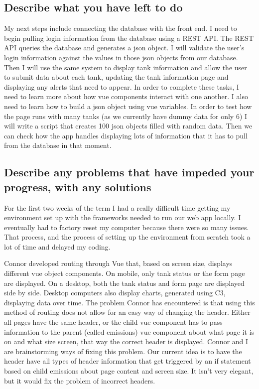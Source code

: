 \documentclass[draftclsnofoot,onecolumn,letterpaper,10pt,compsoc]{IEEEtran}
\begin{document}
\subsection{Describe what you have left to do}
My next steps include connecting the database with the front end. I need to begin pulling login information from the database using a REST API. The REST API queries the database and generates a json object. I will validate the user’s login information against the values in those json objects from our database. Then I will use the same system to display tank information and allow the user to submit data about each tank, updating the tank information page and displaying any alerts that need to appear. In order to complete these tasks, I need to learn more about how vue components interact with one another. I also need to learn how to build a json object using vue variables. In order to test how the page runs with many tanks (as we currently have dummy data for only 6) I will write a script that creates 100 json objects filled with random data. Then we can check how the app handles displaying lots of information that it has to pull from the database in that moment.  


\subsection{Describe any problems that have impeded your progress, with any solutions}
For the first two weeks of the term I had a really difficult time getting my environment set up with the frameworks needed to run our web app locally. I eventually had to factory reset my computer because there were so many issues. That process, and the process of setting up the environment from scratch took a lot of time and delayed my coding. 

Connor developed routing through Vue that, based on screen size, displays different vue object components. On mobile, only tank status or the form page are displayed. On a desktop, both the tank status and form page are displayed side by side. Desktop computers also display charts, generated using C3, displaying data over time. The problem Connor has encountered is that using this method of routing does not allow for an easy way of changing the header. Either all pages have the same header, or the child vue component has to pass information to the parent (called emissions) vue component about what page it is on and what size screen, that way the correct header is displayed. Connor and I are brainstorming ways of fixing this problem. Our current idea is to have the header have all types of header information that get triggered by an if statement based on child emissions about page content and screen size. It isn’t very elegant, but it would fix the problem of incorrect headers. 
\end{document}
